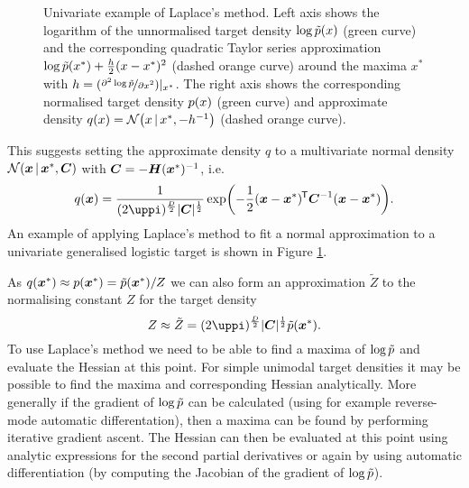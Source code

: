 \begin{figure}[!t]
\centering
{}
\vspace{-3mm}
\caption[Univariate example of Laplace's method.]{Univariate example of Laplace's method. Left axis shows the logarithm of the unnormalised target density $\log\tilde{p}(x)$ (green curve) and the corresponding quadratic Taylor series approximation $\log\tilde{p}(x^*) + \frac{h}{2}(x-x^*)^2$ (dashed orange curve) around the maxima $x^*$ with $h = (\nicefrac{\partial^2\log\tilde{p}}{\partial x^2})|_{x^*}$. The right axis shows the corresponding normalised target density $p(x)$ (green curve) and approximate density $q(x) = \nrm{x \gvn x^*, -h^{-1}}$ (dashed orange curve).}
\label{fig:laplace-approximation-example}
\end{figure}

This suggests setting the approximate density $q$ to a multivariate normal density $\nrm{\vct{x} \gvn \vct{x}^*,\mtx{C}}$ with $\boldsymbol{C} = -\boldsymbol{H}(\boldsymbol{x}^*)^{-1}$, i.e.
\begin{equation}\label{eq:laplace-approximation}
  q(\vct{x}) = 
  \frac{1}{(2\uppi)^{\frac{D}{2}}|\mtx{C}|^{\frac{1}{2}}} 
  \exp\lpa-\frac{1}{2}(\vct{x}-\vct{x}^*)\tr\mtx{C}^{-1}(\vct{x}-\vct{x}^*)\rpa.
\end{equation}
An example of applying Laplace's method to fit a normal approximation to a univariate generalised logistic target is shown in Figure \ref{fig:laplace-approximation-example}.

As $q(\boldsymbol{x}^*) \approx p(\boldsymbol{x}^*) = \tilde{p}(\boldsymbol{x}^*) / Z$ we can also form an approximation $\tilde{Z}$ to the normalising constant $Z$ for the target density
\begin{equation}\label{eq:laplace-approximation-normalising-const}
  Z \approx \tilde{Z} = (2\uppi)^{\frac{D}{2}} |\mtx{C}|^{\frac{1}{2}}\utgtdens(\vct{x}^*).
\end{equation}
To use Laplace's method we need to be able to find a maxima of $\log\tilde{p}$ and evaluate the Hessian at this point. For simple unimodal target densities it may be possible to find the maxima and corresponding Hessian analytically. More generally if the gradient of $\log\tilde{p}$ can be calculated (using for example reverse-mode automatic differentation), then a maxima can be found by performing iterative gradient ascent. The Hessian can then be evaluated at this point using analytic expressions for the second partial derivatives or again by using automatic differentiation (by computing the Jacobian of the gradient of $\log\tilde{p}$).

